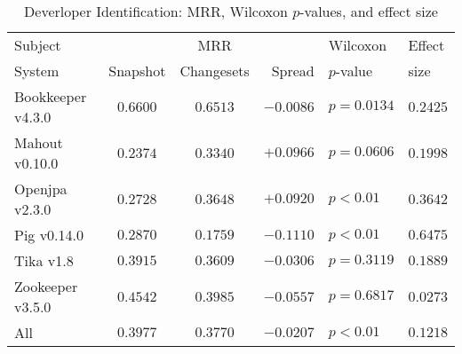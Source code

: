 \begin{table}[t]
\centering
\caption{Deverloper Identification: MRR, Wilcoxon $p$-values, and effect size}
\begin{tabular}{l|ccr|ll}
\toprule
Subject & & MRR & & Wilcoxon & Effect \\
System  &  Snapshot & Changesets & Spread & $p$-value & size \\
\midrule
Bookkeeper v4.3.0 & $\bm{0.6600}$ & $0.6513$ & $-0.0086$ & $p = 0.0134$ & $0.2425$ \\
Mahout v0.10.0 & $0.2374$ & $\bm{0.3340}$ & $+0.0966$ & $p = 0.0606$ & $0.1998$ \\
Openjpa v2.3.0 & $0.2728$ & $\bm{0.3648}$ & $+0.0920$ & $p < 0.01$ & $0.3642$ \\
Pig v0.14.0 & $\bm{0.2870}$ & $0.1759$ & $-0.1110$ & $p < 0.01$ & $0.6475$ \\
Tika v1.8 & $\bm{0.3915}$ & $0.3609$ & $-0.0306$ & $p = 0.3119$ & $0.1889$ \\
Zookeeper v3.5.0 & $\bm{0.4542}$ & $0.3985$ & $-0.0557$ & $p = 0.6817$ & $0.0273$ \\
\midrule
All & $\bm{0.3977}$ & $0.3770$ & $-0.0207$ & $p < 0.01$ & $0.1218$ \\
\bottomrule
\end{tabular}
\label{table:triage_rq1}
\end{table}
